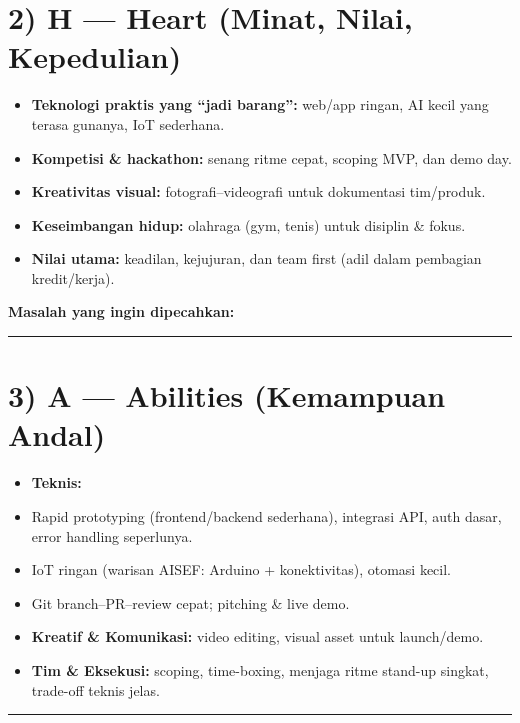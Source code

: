 \documentclass[
  letterpaper,
  DIV=11,
  numbers=noendperiod]{scrreprt}
\begin{document}
\section{2) H --- Heart (Minat, Nilai,
Kepedulian)}\label{h-heart-minat-nilai-kepedulian}

\begin{itemize}
\item
  \textbf{Teknologi praktis yang ``jadi barang'':} web/app ringan, AI
  kecil yang terasa gunanya, IoT sederhana.
\item
  \textbf{Kompetisi \& hackathon:} senang ritme cepat, scoping MVP, dan
  demo day.
\item
  \textbf{Kreativitas visual:} fotografi--videografi untuk dokumentasi
  tim/produk.
\item
  \textbf{Keseimbangan hidup:} olahraga (gym, tenis) untuk disiplin \&
  fokus.
\item
  \textbf{Nilai utama:} keadilan, kejujuran, dan team first (adil dalam
  pembagian kredit/kerja).
\end{itemize}

\textbf{Masalah yang ingin dipecahkan:}

\begin{center}\rule{0.5\linewidth}{0.5pt}\end{center}

\section{3) A --- Abilities (Kemampuan
Andal)}\label{a-abilities-kemampuan-andal}

\begin{itemize}
\item
  \textbf{Teknis:}
\item
  Rapid prototyping (frontend/backend sederhana), integrasi API, auth
  dasar, error handling seperlunya.
\item
  IoT ringan (warisan AISEF: Arduino + konektivitas), otomasi kecil.
\item
  Git branch--PR--review cepat; pitching \& live demo.
\item
  \textbf{Kreatif \& Komunikasi:} video editing, visual asset untuk
  launch/demo.
\item
  \textbf{Tim \& Eksekusi:} scoping, time-boxing, menjaga ritme stand-up
  singkat, trade-off teknis jelas.
\end{itemize}

\begin{center}\rule{0.5\linewidth}{0.5pt}\end{center}
\end{document}
